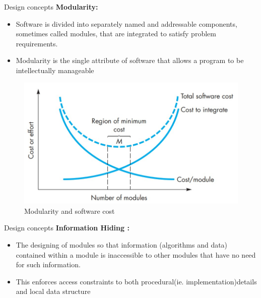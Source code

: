 \documentclass{beamer}
\begin{document}
\begin{frame}{Design concepts}
	\textbf{Modularity:}
	\begin{itemize}
		\item Software is divided into separately named and addressable components, sometimes called 
		modules, that are integrated to satisfy problem requirements. 
		\item Modularity is the single attribute of software that allows a program to be 
		intellectually manageable
		
	\end{itemize}
	\begin{figure}
	\includegraphics[scale=.45]{img/m2_34.jpg}
	\caption{Modularity 
		and software 
		cost  }
\end{figure}
\end{frame}
\begin{frame}{Design concepts}
	\textbf{Information Hiding :}
	\begin{itemize}
		\item The designing of modules so that information (algorithms and data)  contained within a module is inaccessible to other modules that have no  need for such information.
		\item This enforces access constraints to both procedural(ie. implementation)details and local data structure
	\end{itemize}

\end{frame}
\end{document}
